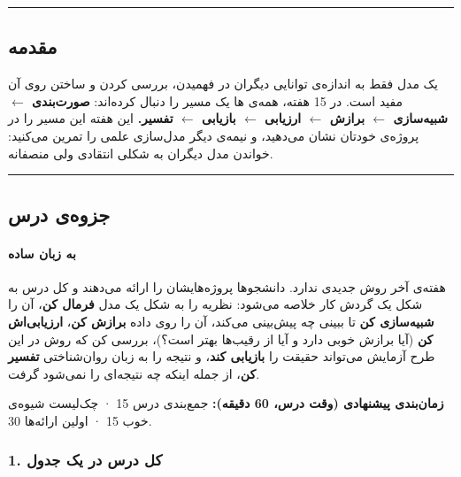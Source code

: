 \begin{center}\rule{0.5\linewidth}{0.5pt}\end{center}

\subsection{مقدمه}

یک مدل فقط به اندازه‌ی توانایی دیگران در فهمیدن، بررسی کردن و ساختن روی
آن مفید است. در 15 هفته، همه‌ی ها یک مسیر را دنبال کرده‌اند:
\textbf{صورت‌بندی \ensuremath{\leftarrow} شبیه‌سازی \ensuremath{\leftarrow} برازش \ensuremath{\leftarrow} ارزیابی \ensuremath{\leftarrow} بازیابی \ensuremath{\leftarrow} تفسیر.} این
هفته این مسیر را در پروژه‌ی خودتان نشان می‌دهید، و نیمه‌ی دیگر مدل‌سازی علمی
را تمرین می‌کنید: خواندن مدل دیگران به شکلی انتقادی ولی منصفانه.

\begin{center}\rule{0.5\linewidth}{0.5pt}\end{center}


\subsection{جزوه‌ی درس}

\paragraph{به زبان ساده}

هفته‌ی آخر روش جدیدی ندارد. دانشجوها پروژه‌هایشان را ارائه می‌دهند و کل درس
به شکل یک گردش کار خلاصه می‌شود: نظریه را به شکل یک مدل \textbf{فرمال
کن}، آن را \textbf{شبیه‌سازی کن} تا ببینی چه پیش‌بینی می‌کند، آن را روی
داده \textbf{برازش کن}، \textbf{ارزیابی‌اش کن} (آیا برازش خوبی دارد و آیا
از رقیب‌ها بهتر است؟)، بررسی کن که روش در این طرح آزمایش می‌تواند حقیقت را
\textbf{بازیابی کند}، و نتیجه را به زبان روان‌شناختی \textbf{تفسیر کن}،
از جمله اینکه چه نتیجه‌ای را نمی‌شود گرفت.

\textbf{زمان‌بندی پیشنهادی (وقت درس، 60 دقیقه):} جمع‌بندی درس 15 · چک‌لیست
شیوه‌ی خوب 15 · اولین ارائه‌ها 30.

\subsubsection{1. کل درس در یک جدول}

